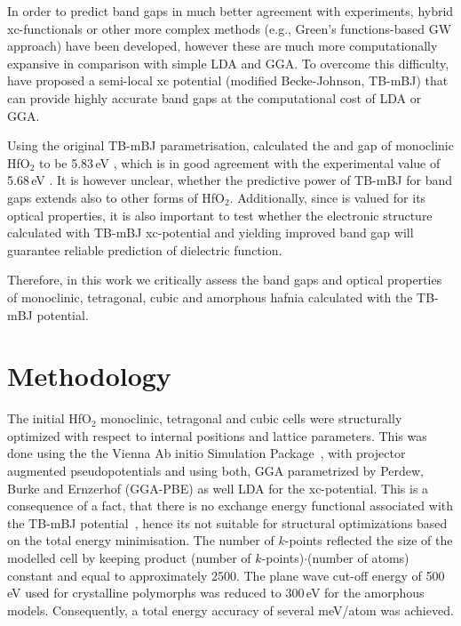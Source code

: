 \documentclass[10pt,a4paper,twocolumn]{article}
\begin{document}
In order to predict band gaps in much better agreement with experiments, hybrid xc-functionals or other more complex methods (e.g., Green's functions-based GW approach) have been developed, however these are much more computationally expansive in comparison with simple LDA and GGA.
To overcome this difficulty, \citet{Tran2009} have proposed a semi-local xc potential (modified Becke-Johnson, TB-mBJ) that can provide highly accurate band gaps at the computational cost of LDA or GGA.

Using the original TB-mBJ parametrisation, \citet{Koller2012} calculated the and gap of monoclinic HfO$_2$ to be 5.83\,eV , which is in good agreement with the experimental value of 5.68\,eV \cite{Balog1977}.
It is however unclear, whether the predictive power of TB-mBJ for band gaps extends also to other forms of HfO$_2$.
Additionally, since  is valued for its optical properties, it is also important to test whether the electronic structure calculated with TB-mBJ xc-potential and yielding improved band gap will guarantee reliable prediction of dielectric function.



Therefore, in this work we critically assess the band gaps and optical properties of monoclinic, tetragonal, cubic and amorphous hafnia calculated with the TB-mBJ potential.

\section{Methodology}

The initial HfO$_2$ monoclinic, tetragonal and cubic cells were structurally optimized with respect to internal positions and lattice parameters.
This was done using the the Vienna Ab initio Simulation Package~\cite{Kresse1996}, with projector augmented pseudopotentials \cite{Kresse1999} and using both, GGA parametrized by Perdew, Burke and Ernzerhof (GGA-PBE) \cite{Perdew1996} as well LDA for the xc-potential.
This is a consequence of a fact, that there is no exchange energy functional associated with the TB-mBJ potential~\cite{Tran2009}, hence its not suitable for structural optimizations based on the total energy minimisation.
The number of $k$-points reflected the size of the modelled cell by keeping product (number of $k$-points)$\cdot$(number of atoms) constant and equal to approximately 2500.
The plane wave cut-off energy of 500\,eV used for crystalline polymorphs was reduced to 300\,eV for the amorphous models.
Consequently, a total energy accuracy of several meV/atom was achieved.
\end{document}
